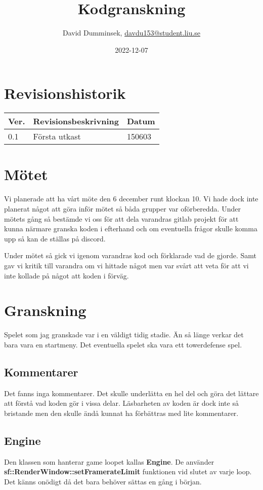 \documentclass{TDP003mall}
\author{David Dumminsek, \url{davdu153@student.liu.se}}
\title{Kodgranskning}
\date{2022-12-07}
\begin{document}
\projectpage
\section{Revisionshistorik}
\begin{table}[!h]
    \begin{tabularx}{\linewidth}{|l|X|l|}
        \hline
        Ver. & Revisionsbeskrivning & Datum  \\\hline
        0.1  & Första utkast        & 150603 \\\hline
    \end{tabularx}
\end{table}


\section{Mötet}
Vi planerade att ha vårt möte den 6 december runt klockan 10.
Vi hade dock inte planerat något att göra inför mötet så båda grupper var oförberedda.
Under mötets gång så bestämde vi oss för att dela varandras gitlab projekt för att kunna närmare granska koden i efterhand 
och om eventuella frågor skulle komma upp så kan de ställas på discord.

Under mötet så gick vi igenom varandras kod och förklarade vad de gjorde. 
Samt gav vi kritik till varandra om vi hittade något men var svårt att veta för att vi inte kollade på något att koden i förväg.

\section{Granskning}
Spelet som jag granskade var i en väldigt tidig stadie.
Än så länge verkar det bara vara en startmeny.
Det eventuella spelet ska vara ett towerdefense spel.
\subsection{Kommentarer}
Det fanns inga kommentarer.
Det skulle underlätta en hel del och göra det lättare att förstå vad koden gör i vissa delar.
Läsbarheten av koden är dock inte så bristande men den skulle ändå kunnat ha förbättras med lite kommentarer.

\subsection{Engine}
Den klassen som hanterar game loopet kallas \textbf{Engine}.
De använder \textbf{sf::RenderWindow::setFramerateLimit} funktionen vid slutet av varje loop.
Det känns onödigt då det bara behöver sättas en gång i början.
\end{document}
